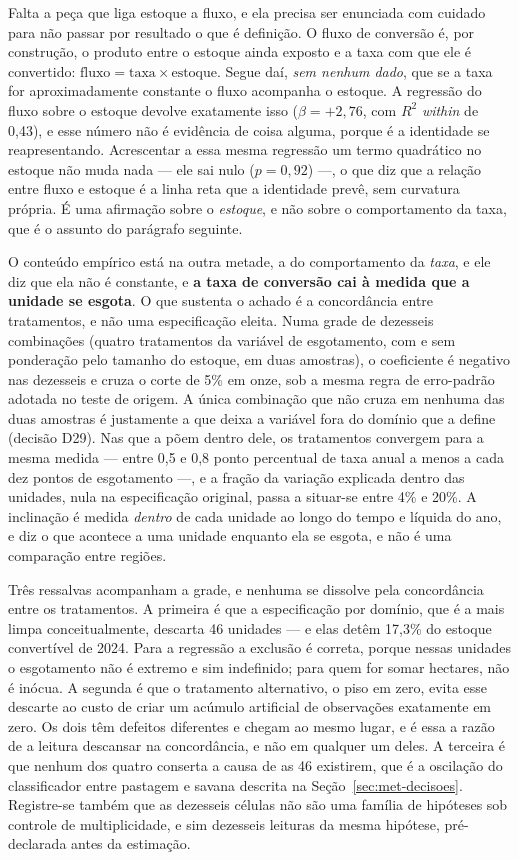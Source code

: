 Falta a peça que liga estoque a fluxo, e ela precisa ser enunciada com cuidado
para não passar por resultado o que é definição. O fluxo de conversão é, por
construção, o produto entre o estoque ainda exposto e a taxa com que ele é
convertido: $\text{fluxo} = \text{taxa} \times \text{estoque}$. Segue daí,
\emph{sem nenhum dado}, que se a taxa for aproximadamente constante o fluxo
acompanha o estoque. A regressão do fluxo sobre o estoque devolve exatamente
isso ($\beta = +2{,}76$, com $R^2$ \emph{within} de 0,43), e esse número não é
evidência de coisa alguma, porque é a identidade se reapresentando. Acrescentar a essa
mesma regressão um termo quadrático no estoque não muda nada --- ele sai nulo
($p = 0{,}92$) ---, o que diz que a relação entre fluxo e estoque é a linha reta
que a identidade prevê, sem curvatura própria. É uma afirmação sobre o
\emph{estoque}, e não sobre o comportamento da taxa, que é o assunto do
parágrafo seguinte.

O conteúdo empírico está na outra metade, a do comportamento da \emph{taxa}, e
ele diz que ela não é constante, e \textbf{a taxa de conversão cai à medida que a
unidade se esgota}. O que sustenta o achado é a concordância entre
tratamentos, e não uma especificação eleita. Numa grade de dezesseis
combinações (quatro tratamentos da variável de esgotamento, com e sem
ponderação pelo tamanho do estoque, em duas amostras), o coeficiente é
negativo nas dezesseis e cruza o corte de 5\% em onze, sob a mesma regra de
erro-padrão adotada no teste de origem. A única combinação que não cruza em
nenhuma das duas amostras é justamente a que deixa a variável fora do domínio
que a define (decisão D29). Nas que a põem dentro dele, os tratamentos
convergem para a mesma medida --- entre 0,5 e 0,8 ponto percentual de taxa
anual a menos a cada dez pontos de esgotamento ---, e a fração da variação
explicada dentro das unidades, nula na especificação original, passa a
situar-se entre 4\% e 20\%. A inclinação é medida \emph{dentro} de cada
unidade ao longo do tempo e líquida do ano, e diz o que acontece a uma unidade
enquanto ela se esgota, e não é uma comparação entre regiões.

Três ressalvas acompanham a grade, e nenhuma se dissolve pela concordância
entre os tratamentos. A primeira é que a especificação por domínio, que é a
mais limpa conceitualmente, descarta 46 unidades --- e elas detêm 17,3\% do
estoque convertível de 2024. Para a regressão a exclusão é correta, porque
nessas unidades o esgotamento não é extremo e sim indefinido; para quem for somar
hectares, não é inócua. A segunda é que o tratamento alternativo, o piso em
zero, evita esse descarte ao custo de criar um acúmulo artificial de
observações exatamente em zero. Os dois têm defeitos diferentes e chegam ao
mesmo lugar, e é essa a razão de a leitura descansar na concordância, e não em
qualquer um deles. A terceira é que nenhum dos quatro conserta a causa de as 46
existirem, que é a oscilação do classificador entre pastagem e savana descrita
na Seção~\ref{sec:met-decisoes}. Registre-se também que as dezesseis células
não são uma família de hipóteses sob controle de multiplicidade, e sim dezesseis
leituras da mesma hipótese, pré-declarada antes da estimação.

